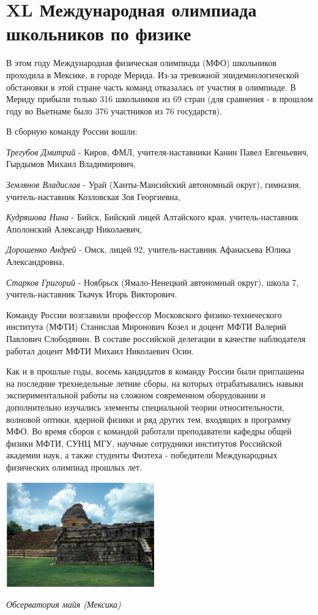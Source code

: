 \section*{\centering XL Международная олимпиада школьников по физике}
\begin{multicols*}{2}
    \footnotesize В этом году Международная физическая олимпиада (МФО) школьников проходила в Мексике, в городе Мерида. Из-за тревожной эпидемиологической обстановки в этой стране часть команд отказалась от участия в олимпиаде. В Мериду прибыли только 316 школьников из 69 стран (для сравнения - в прошлом году во Вьетнаме было 376 участников из 76 государств).
    
    В сборную команду России вошли:
    
    \textit{Трегубов Дмитрий} - Киров, ФМЛ, учителя-наставники Канин Павел Евгеньевич, Гырдымов Михаил Владимирович,
    
    \textit{Землянов Владислав} - Урай (Ханты-Мансийский автономный округ), гимназия, учитель-наставник Козловская Зоя Георгиевна,
    
    \textit{Кудряшова Нина} - Бийск, Бийский лицей Алтайского края, учитель-наставник Аполонский Александр Николаевич,
    
    \textit{Дорошенко Андрей} - Омск, лицей 92, учитель-наставник Афанасьева Юлика Александровна,
   
    \textit{Старков Григорий} - Ноябрьск (Ямало-Ненецкий автономный округ), школа 7, учитель-наставник Ткачук Игорь Викторович.
    
    Команду России возглавили профессор Московского физико-технического института (МФТИ) Станислав Миронович Козел и доцент МФТИ Валерий Павлович Слободянин. В составе российской делегации в качестве наблюдателя работал доцент МФТИ Михаил Николаевич Осин.
    
    Как и в прошлые годы, восемь кандидатов в команду России были приглашены на последние трехнедельные летние сборы, на которых отрабатывались навыки экспериментальной работы на сложном современном оборудовании и дополнительно изучались элементы специальной теории относительности, волновой оптики, ядерной физики и ряд других тем, входящих в программу МФО. Во время сборов с командой работали преподаватели кафедры общей физики МФТИ, СУНЦ МГУ, научные сотрудники институтов Российской академии наук, а также студенты Физтеха - победители Международных физических олимпиад прошлых лет.
    
    \begin{center}
        \includegraphics[width=0.48\textwidth]{observatory.png}
    \end{center}
    \textit{Обсерватория майя (Мексика)}
    

\end{multicols*}
